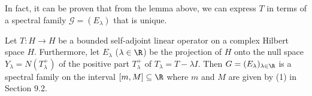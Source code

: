 In fact, it can be proven that from the lemma above, we can express \( T  \) in terms of a spectral family \( \mathcal{G} = ({E}_{\lambda}) \) that is unique.

\begin{theorem}\label{9.8-3}
    Let \( T : H \to H  \) be a bounded self-adjoint linear operator on a complex Hilbert space \( H  \). Furthermore, let \( {E}_{\lambda}  \) (\( \lambda \in \R  \)) be the projection of \( H  \) onto the null space \( {Y}_{\lambda } = N({T}_{\lambda}^{+}) \) of the positive part \( {T}_{\lambda}^{+}  \) of \( {T}_{\lambda} = T - \lambda I  \). Then \( G = ({E}_{\lambda})_{\lambda \in \R }\) is a spectral family on the interval \( [m,M ] \subseteq \R  \) where \( m  \) and \( M  \) are given by (1) in Section 9.2.
\end{theorem}
